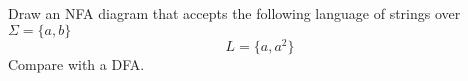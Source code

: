Draw an NFA diagram that accepts the following
language of strings over $\Sigma =
\{ a, b \}$ 
\[
L = \{a, a^2\}
\]
Compare with a DFA.
\vspace{2in}
